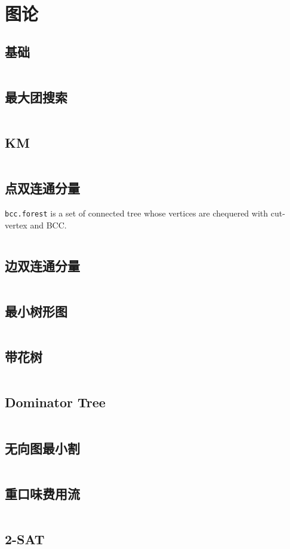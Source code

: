 \chapter{图论}
\section{基础}
\inputminted{cpp}{\source/graph-theory/basis.cpp}
\section{最大团搜索}
\inputminted{cpp}{\source/graph-theory/maximum-clique.cpp}
\section{KM}
\inputminted{cpp}{\source/graph-theory/KM.cpp}
\section{点双连通分量}
\texttt{bcc.forest} is a set of connected tree whose vertices are chequered with cut-vertex and BCC.
\inputminted{cpp}{\source/graph-theory/biconnected-graph-vertex.cpp}
\section{边双连通分量}
\inputminted{cpp}{\source/graph-theory/biconnected-graph-edge.cpp}
\section{最小树形图}
\inputminted{cpp}{\source/graph-theory/optimum-branching.cpp}
\section{带花树}
\inputminted{cpp}{\source/graph-theory/blossom-algorithm.cpp}
\section{Dominator Tree}
\inputminted{cpp}{\source/graph-theory/dominator-tree.cpp}
\section{无向图最小割}
\inputminted{cpp}{\source/graph-theory/stoer-wagner-algorithm.cpp}
\section{重口味费用流}
\inputminted{cpp}{\source/graph-theory/zkw-cost-flow.cpp}
\section{2-SAT}
\inputminted{cpp}{\source/graph-theory/2-satisfiability.cpp}
